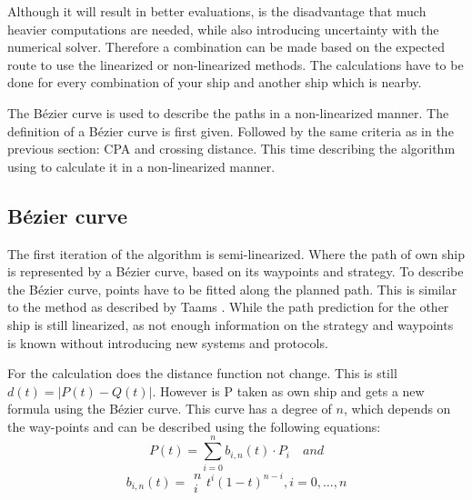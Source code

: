 Although it will result in better evaluations, is the disadvantage that much heavier computations are needed, while also introducing uncertainty with the numerical solver. Therefore a combination can be made based on the expected route to use the linearized or non-linearized methods. The calculations have to be done for every combination of your ship and another ship which is nearby.

The Bézier curve is used to describe the paths in a non-linearized manner. The definition of a Bézier curve is first given. Followed by the same criteria as in the previous section: \acf{CPA} and crossing distance. This time describing the algorithm using to calculate it in a non-linearized manner.

\subsection{Bézier curve}
The first iteration of the algorithm is semi-linearized. Where the path of own ship is represented by a Bézier curve, based on its waypoints and strategy. To describe the Bézier curve, points have to be fitted along the planned path. This is similar to the method as described by Taams \cite{Taams2018}. While the path prediction for the other ship is still linearized, as not enough information on the strategy and waypoints is known without introducing new systems and protocols.

For the calculation does the distance function not change. This is still $
d(t) = |P(t) - Q(t)|$. However is P taken as own ship and gets a new formula using the Bézier curve. This curve has a degree of $n$, which depends on the way-points and can be described using the following equations:
\begin{equation}
P(t) = \sum\limits_{i=0}^n b_{i,n}(t) \cdot P_i \quad and
\end{equation}
\begin{equation}
b_{i,n}(t) = \begin{array}{c} n \\ i \end{array} t^i(1-t)^{n-i}, i = 0,\dots,n
\end{equation}


